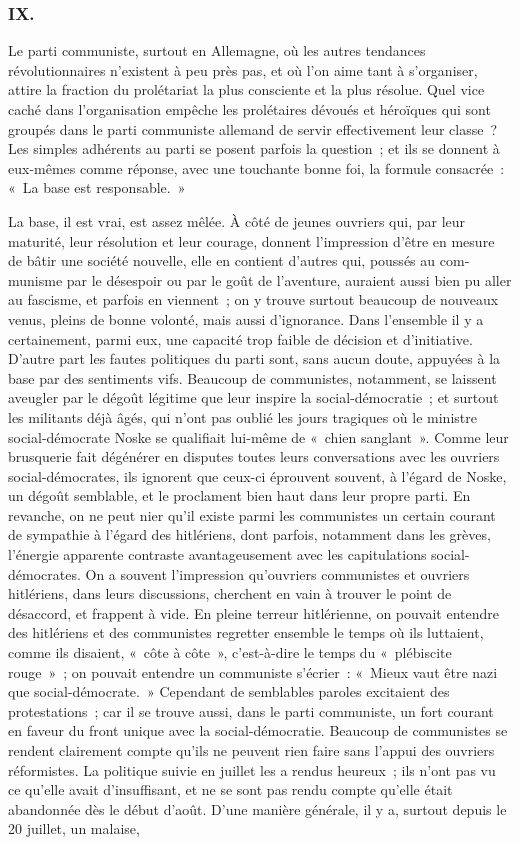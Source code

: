\documentclass[french,twoside]{book} %
\begin{document}
\subsubsection[IX.]{IX.}
\noindent Le parti communiste, surtout en Allemagne, où les autres tendances révolutionnaires n'existent à peu près pas, et où l'on aime tant à s'organiser, attire la fraction du prolétariat la plus consciente et la plus résolue. Quel vice caché dans l'organisation empêche les prolétaires dévoués et héroïques qui sont groupés dans le parti communiste allemand de servir effectivement leur classe ? Les simples adhérents au parti se posent parfois la question ; et ils se donnent à eux-mêmes comme réponse, avec une touchante bonne foi, la formule consacrée : « La base est responsable. »\par
La base, il est vrai, est assez mêlée. À côté de jeunes ouvriers qui, par leur maturité, leur résolution et leur courage, donnent l'impression d'être en mesure de bâtir une société nouvelle, elle en contient d'autres qui, poussés au com­munisme par le désespoir ou par le goût de l'aventure, auraient aussi bien pu aller au fascisme, et parfois en viennent ; on y trouve surtout beaucoup de nou­veaux venus, pleins de bonne volonté, mais aussi d'ignorance. Dans l'ensemble il y a certainement, parmi eux, une capacité trop faible de décision et d'initiative. D'autre part les fautes politiques du parti sont, sans aucun doute, appuyées à la base par des sentiments vifs. Beaucoup de communistes, notamment, se laissent aveugler par le dégoût légitime que leur inspire la social-démocratie ; et surtout les militants déjà âgés, qui n'ont pas oublié les jours tragiques où le ministre social-démocrate Noske se qualifiait lui-même de « chien sanglant ». Comme leur brusquerie fait dégénérer en disputes toutes leurs conversations avec les ouvriers social-démocrates, ils ignorent que ceux-ci éprouvent souvent, à l'égard de Noske, un dégoût semblable, et le proclament bien haut dans leur propre parti. En revanche, on ne peut nier qu'il existe parmi les communistes un certain courant de sympathie à l'égard des hitlériens, dont parfois, notamment dans les grèves, l'énergie apparente con­traste avantageusement avec les capitulations social-démocrates. On a souvent l'impression qu'ouvriers communistes et ouvriers hitlériens, dans leurs discussions, cherchent en vain à trouver le point de désaccord, et frappent à vide. En pleine terreur hitlérienne, on pouvait entendre des hitlériens et des communistes regretter ensemble le temps où ils luttaient, comme ils disaient, « côte à côte », c'est-à-dire le temps du « plébiscite rouge » ; on pouvait enten­dre un communiste s'écrier : « Mieux vaut être nazi que social-démocrate. » Cependant de semblables paroles excitaient des protestations ; car il se trouve aussi, dans le parti communiste, un fort courant en faveur du front unique avec la social-démocratie. Beaucoup de communistes se rendent clairement compte qu'ils ne peuvent rien faire sans l'appui des ouvriers réformistes. La politique suivie en juillet les a rendus heureux ; ils n'ont pas vu ce qu'elle avait d'insuffisant, et ne se sont pas rendu compte qu'elle était abandonnée dès le début d'août. D'une manière générale, il y a, surtout depuis le 20 juillet, un malaise, 
\end{document}
